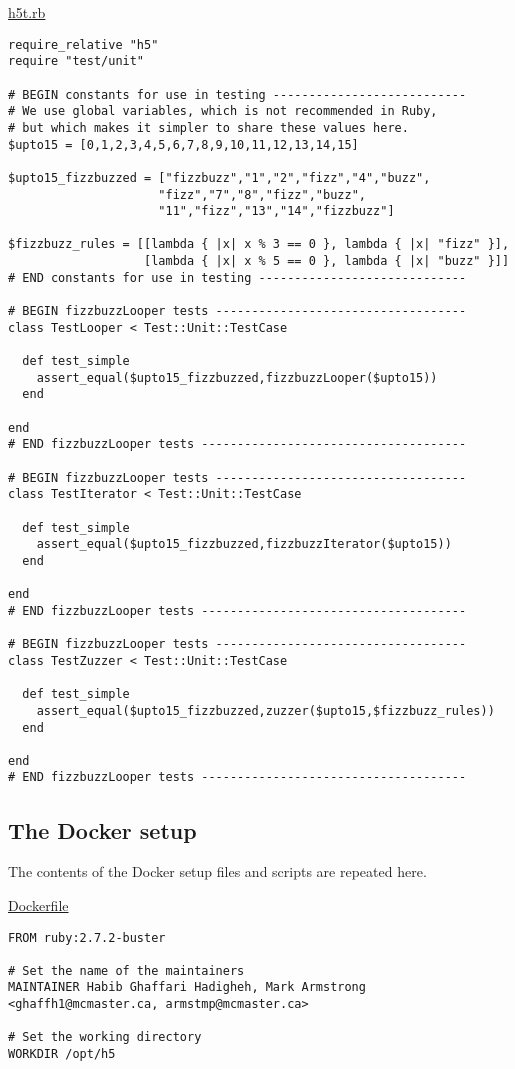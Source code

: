 \documentclass[11pt]{article}
\begin{document}
\href{./testing/h5/h5t.rb}{h5t.rb}
\begin{verbatim}
require_relative "h5"
require "test/unit"

# BEGIN constants for use in testing ---------------------------
# We use global variables, which is not recommended in Ruby,
# but which makes it simpler to share these values here.
$upto15 = [0,1,2,3,4,5,6,7,8,9,10,11,12,13,14,15]

$upto15_fizzbuzzed = ["fizzbuzz","1","2","fizz","4","buzz",
                     "fizz","7","8","fizz","buzz",
                     "11","fizz","13","14","fizzbuzz"]

$fizzbuzz_rules = [[lambda { |x| x % 3 == 0 }, lambda { |x| "fizz" }],
                   [lambda { |x| x % 5 == 0 }, lambda { |x| "buzz" }]]
# END constants for use in testing -----------------------------

# BEGIN fizzbuzzLooper tests -----------------------------------
class TestLooper < Test::Unit::TestCase

  def test_simple
    assert_equal($upto15_fizzbuzzed,fizzbuzzLooper($upto15))
  end

end
# END fizzbuzzLooper tests -------------------------------------

# BEGIN fizzbuzzLooper tests -----------------------------------
class TestIterator < Test::Unit::TestCase

  def test_simple
    assert_equal($upto15_fizzbuzzed,fizzbuzzIterator($upto15))
  end

end
# END fizzbuzzLooper tests -------------------------------------

# BEGIN fizzbuzzLooper tests -----------------------------------
class TestZuzzer < Test::Unit::TestCase

  def test_simple
    assert_equal($upto15_fizzbuzzed,zuzzer($upto15,$fizzbuzz_rules))
  end

end
# END fizzbuzzLooper tests -------------------------------------
\end{verbatim}

\subsection*{The Docker setup}
\label{sec:org7351740}
The contents of the Docker setup files and scripts are repeated here.

\href{./testing/h5/Dockerfile}{Dockerfile}
\begin{verbatim}
FROM ruby:2.7.2-buster

# Set the name of the maintainers
MAINTAINER Habib Ghaffari Hadigheh, Mark Armstrong <ghaffh1@mcmaster.ca, armstmp@mcmaster.ca>

# Set the working directory
WORKDIR /opt/h5
\end{verbatim}
\end{document}
